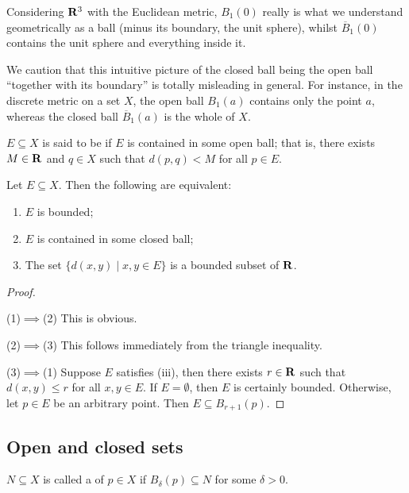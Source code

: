\begin{example}
Considering $\mathbf R^3$ with the Euclidean metric, $B_1(0)$ really is what we understand geometrically as a ball (minus its boundary, the unit sphere), whilst $\overline{B}_1(0)$ contains the unit sphere and everything inside it.
\end{example}

\begin{remark}
We caution that this intuitive picture of the closed ball being the open ball ``together with its boundary'' is totally misleading in general. For instance, in the discrete metric on a set $X$, the open ball $B_1(a)$ contains only the point $a$, whereas the closed ball $\overline{B}_1(a)$ is the whole of $X$.
\end{remark}

\begin{definition}[Bounded]
$E\subseteq X$ is said to be  if $E$ is contained in some open ball; that is, there exists $M\in\mathbf R$ and $q\in X$ such that $d(p,q)<M$ for all $p\in E$.
\end{definition}

\begin{proposition}
Let $E\subseteq X$. Then the following are equivalent:
\begin{enumerate}[label=(\roman*)]
\item $E$ is bounded;
\item $E$ is contained in some closed ball;
\item The set $\{d(x,y)\mid x,y\in E\}$ is a bounded subset of $\mathbf R$.
\end{enumerate}
\end{proposition}

\begin{proof} \

(1)$\implies$(2) This is obvious.

(2)$\implies$(3) This follows immediately from the triangle inequality.

(3)$\implies$(1) Suppose $E$ satisfies (iii), then there exists $r\in\mathbf R$ such that $d(x,y)\le r$ for all $x,y\in E$. If $E=\emptyset$, then $E$ is certainly bounded. Otherwise, let $p\in E$ be an arbitrary point. Then $E\subseteq B_{r+1}(p)$.
\end{proof}

\subsection{Open and closed sets}
\begin{definition}[Neighbourhood]
$N\subseteq X$ is called a  of $p\in X$ if $B_\delta(p)\subseteq N$ for some $\delta>0$.
\end{definition}

